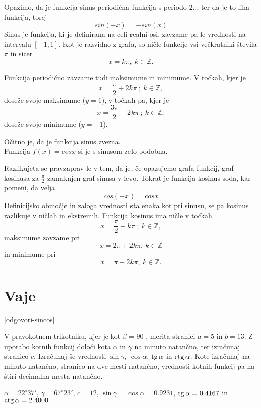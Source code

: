 
Opazimo, da je funkcija sinus periodična funkcija s periodo $2\pi$, ter da je to liha funkcija, torej
\[
sin(-x) = -sin(x)
\]
Sinus je funkcija, ki je definirana na celi realni osi, zavzame pa le vrednosti na intervalu $[-1, 1]$. Kot je razvidno z grafa, so ničle funkcije vsi večkratniki števila $\pi$ in sicer 
\[
x = k\pi, \:   k\in \mathbb{Z}.
\]

Funkcija periodično zavzame tudi maksimume in minimume. V točkah, kjer je 
\[
x = \frac{\pi}{2} + 2k\pi \: ; \: k \in \mathbb{Z},
\]
doseže svoje maksimume ($y = 1$), v točkah pa, kjer je  
\[
x = \frac{3\pi}{2} + 2k\pi \: ; \: k \in \mathbb{Z},
\] 
doseže svoje minimume ($y = -1$).

Očitno je, da je funkcija sinus zvezna.\\

Funkcija $f(x) = cosx$ si je s sinusom zelo podobna.

Razlikujeta se pravzaprav le v tem, da je, če opazujemo grafa funkcij, graf kosinusa za $\frac{\pi}{2}$ zamaknjen graf sinusa v levo. Tokrat je funkcija kosinus soda, kar pomeni, da velja
\[
cos(-x) = cosx
\]
Definicijsko območje in zaloga vrednosti sta enaka kot pri sinusu, se pa kosinus razlikuje v ničlah in ekstremih. Funkcija kosinus ima ničle v točkah 
\[
x = \frac{\pi}{2} + k\pi \: ; \: k \in \mathbb{Z},
\]
maksimume zavzame pri
\[
x =2\pi + 2 k\pi, \:   k\in \mathbb{Z}
\]
in minimume pri
\[
x =\pi + 2 k\pi, \:   k\in \mathbb{Z}.
\]


\section{Vaje}
\label{sec:sin-cos-vaje}


\def\datotekaOdgovori{odgovori-sincos}

[\datotekaOdgovori]

%

\begin{vaja}
V pravokotnem trikotniku, kjer je kot $\beta= 90^{\circ}$, merita stranici $a=5$ in $b=13$. Z uporabo kotnih funkcij določi kota $\alpha$ in $\gamma$ na minuto natančno, ter izračunaj stranico $c$. Izračunaj še vrednosti $\sin\gamma$, $\cos\alpha$, $\operatorname{tg}\alpha$ in $\operatorname{ctg}\alpha$. Kote izračunaj na minuto natančno, stranico na dve mesti natančno, vrednosti kotnih funkcij pa na štiri decimalna mesta natančno.
	\begin{odgovor}
$\alpha=22^{\circ}37'$, $\gamma=67^{\circ}23'$, $c=12$, $\sin\gamma=\cos\alpha=0.9231$, $\operatorname{tg}\alpha=0.4167$ in $\operatorname{ctg}\alpha=2.4000$
	\end{odgovor}
\end{vaja}


